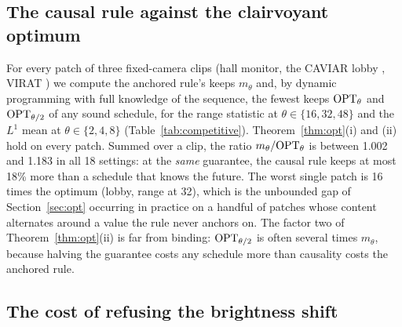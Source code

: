\begin{table}[t]
\centering\scriptsize
\setlength{\tabcolsep}{4pt}

\caption{Synthetic audit of the warp certificate. ``Viol.'' counts dropped patches on which the stated bound fails, checked with exact persistence diagrams. The last column counts features of contrast $\ge \Delta$ in the re-indexed kept pixels and the share of that count matched by features of $W$ of contrast $\ge \Delta - 2\iota$.}
\label{tab:warpaudit}
\end{table}

\subsection{The causal rule against the clairvoyant optimum}
\label{sec:compexp}

For every patch of three fixed-camera clips (hall monitor, the CAVIAR lobby \citep{caviar2004}, VIRAT \citep{oh2011virat}) we compute the anchored rule's keeps $m_\theta$ and, by dynamic programming with full knowledge of the sequence, the fewest keeps $\mathrm{OPT}_\theta$ and $\mathrm{OPT}_{\theta/2}$ of any sound schedule, for the range statistic at $\theta \in \{16, 32, 48\}$ and the $L^1$ mean at $\theta \in \{2, 4, 8\}$ (Table~\ref{tab:competitive}). Theorem~\ref{thm:opt}(i) and (ii) hold on every patch. Summed over a clip, the ratio $m_\theta / \OPT_\theta$ is between 1.002 and 1.183 in all 18 settings: at the \emph{same} guarantee, the causal rule keeps at most 18\% more than a schedule that knows the future. The worst single patch is 16 times the optimum (lobby, range at 32), which is the unbounded gap of Section~\ref{sec:opt} occurring in practice on a handful of patches whose content alternates around a value the rule never anchors on. The factor two of Theorem~\ref{thm:opt}(ii) is far from binding: $\mathrm{OPT}_{\theta/2}$ is often several times $m_\theta$, because halving the guarantee costs any schedule more than causality costs the anchored rule.

\begin{table}[t]
\centering\scriptsize

\caption{Keeps of the anchored rule against the clairvoyant optimum, summed over all patches of a clip. ``Worst patch'' is the largest per-patch ratio $m_\theta/\OPT_\theta$; ``viol.'' counts patches violating Theorem~\ref{thm:opt}(i) or (ii).}
\label{tab:competitive}
\end{table}

\subsection{The cost of refusing the brightness shift}
\label{sec:shiftexp}

